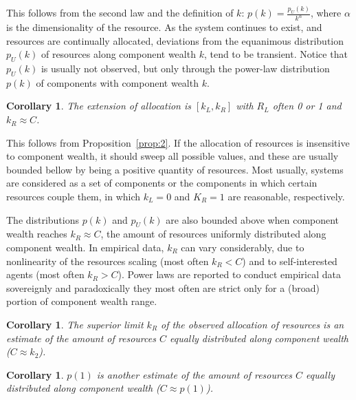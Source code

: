 \documentclass[a4paper, 11pt]{article} %
\newtheorem{corollary}[theorem]{Corollary}
\begin{document}
This follows from the second law and the definition of $k$:
$p(k)=\frac{p_U(k)}{k^\alpha}$, where $\alpha$ is
the dimensionality of the resource.
As the system continues to exist,
and resources are continually allocated, deviations from the equanimous
distribution $p_U(k)$ of resources along component wealth $k$,
 tend to be transient.
 Notice that $p_U(k)$ is usually not observed, but only through 
 the power-law distribution $p(k)$ of components
with component wealth $k$.

\begin{corollary}
	The extension of allocation is $[k_L,k_R]$ with $R_L$ often 0 or 1 and $k_R\approx C$.
\end{corollary}

This follows from Proposition~\ref{prop:2}.
If the allocation of resources is insensitive to component wealth,
it should sweep all possible values, and these are usually
bounded bellow by being a positive quantity of resources.
Most usually, systems are considered as a set of components
or the components in which certain resources couple them,
in which $k_L=0$ and $K_R=1$ are reasonable, respectively.

The distributions $p(k)$ and $p_U(k)$ are also
bounded above when component wealth reaches $k_R \approx C$,
the amount of resources uniformly distributed along component wealth.
In empirical data, $k_R$ can vary considerably, due to
nonlinearity of the resources scaling (most often $k_R<C$) and
to self-interested agents (most often $k_R>C$).
Power laws are reported to conduct empirical data sovereignly and
paradoxically they most often are strict only for a
(broad) portion of component wealth range.


\begin{corollary}
	The superior limit $k_R$ of the observed allocation of resources is an estimate of the amount of resources $C$ equally distributed along component wealth ($C\approx k_2$).
\end{corollary}

\begin{corollary}
	$p(1)$ is another estimate of the amount of resources $C$ equally distributed along component wealth ($C\approx p(1)$).
\end{corollary}
\end{document}
